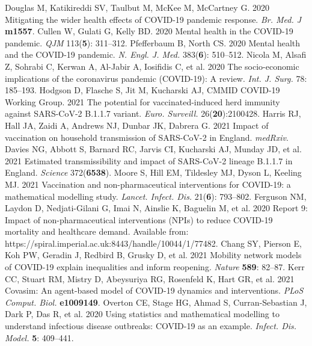 \documentclass{article}
\begin{document}
\begin{thebibliography}{9}

 Douglas M, Katikireddi SV, Taulbut M, McKee M, McCartney G. 2020 Mitigating the wider health effects of COVID-19 pandemic response. \textit{Br. Med. J} \textbf{m1557}.
 Cullen W, Gulati G, Kelly BD. 2020 Mental health in the COVID-19 pandemic. \textit{QJM} 113(\textbf{5}): 311--312.
 Pfefferbaum B, North CS. 2020 Mental health and the COVID-19 pandemic. \textit{N. Engl. J. Med.} 383(\textbf{6}): 510--512. 
 Nicola M, Alsafi Z, Sohrabi C, Kerwan A, Al-Jabir A, Iosifidis C, et al. 2020 The socio-economic implications of the coronavirus pandemic (COVID-19): A review. \textit{Int. J. Surg.} 78: 185--193. 
 Hodgson D, Flasche S, Jit M, Kucharski AJ, CMMID COVID-19 Working Group. 2021 The potential for vaccinated-induced herd immunity against SARS-CoV-2 B.1.1.7 variant. \textit{Euro. Surveill.} 26(\textbf{20}):2100428. 
 Harris RJ, Hall JA, Zaidi A, Andrews NJ, Dunbar JK, Dabrera G. 2021 Impact of vaccination on household transmission of SARS-CoV-2 in England. \textit{medRxiv}. 
 Davies NG, Abbott S, Barnard RC, Jarvis CI, Kucharski AJ, Munday JD, et al. 2021 Estimated transmissibility and impact of SARS-CoV-2 lineage B.1.1.7 in England. \textit{Science} 372(\textbf{6538}).
 Moore S, Hill EM, Tildesley MJ, Dyson L, Keeling MJ. 2021 Vaccination and non-pharmaceutical interventions for COVID-19: a mathematical modelling study. \textit{Lancet. Infect. Dis.} 21(\textbf{6}): 793--802. 
 Ferguson NM, Laydon D, Nedjati-Gilani G, Imai N, Ainslie K, Baguelin M, et al. 2020 Report 9: Impact of non-pharmaceutical interventions (NPIs) to reduce COVID-19 mortality and healthcare demand. Available from: https://spiral.imperial.ac.uk:8443/handle/10044/1/77482. 
 Chang SY, Pierson E, Koh PW, Geradin J, Redbird B, Grusky D, et al. 2021 Mobility network models of COVID-19 explain inequalities and inform reopening. \textit{Nature} \textbf{589}: 82--87. 
 Kerr CC, Stuart RM, Mistry D, Abeysuriya RG, Rosenfeld K, Hart GR, et al. 2021 Covasim: An agent-based model of COVID-19 dynamics and interventions. \textit{PLoS Comput. Biol.} \textbf{e1009149}.
 Overton CE, Stage HG, Ahmad S, Curran-Sebastian J, Dark P, Das R, et al. 2020 Using statistics and mathematical modelling to understand infectious disease outbreaks: COVID-19 as an example. \textit{Infect. Dis. Model.} \textbf{5}: 409--441.

\end{thebibliography}
\end{document}
